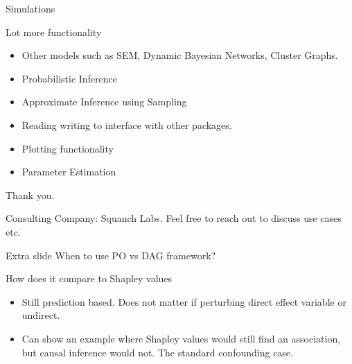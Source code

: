 \documentclass{beamer}
\begin{document}
\begin{frame}{Simulations}
\end{frame}

\begin{frame}{Lot more functionality}
	\begin{itemize}
		\item Other models such as SEM, Dynamic Bayesian Networks, Cluster Graphs.
		\item Probabilistic Inference
		\item Approximate Inference using Sampling
		\item Reading writing to interface with other packages.
		\item Plotting functionality
		\item Parameter Estimation
	\end{itemize}
\end{frame}

\begin{frame}
	Thank you.

	Consulting Company: Squanch Labs. Feel free to reach out to discuss use cases etc.
\end{frame}

\begin{frame}{Extra slide}
	When to use PO vs DAG framework?
\end{frame}

\begin{frame}
	How does it compare to Shapley values 
	\begin{itemize}
		\item Still prediction based. Does not matter if perturbing direct effect variable or undirect.
		\item Can show an example where Shapley values would still find an association, but causal inference would not. The standard confounding case.
	\end{itemize}
\end{frame}
\end{document}
